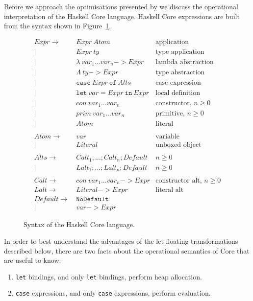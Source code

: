 Before we approach the optimisations presented by \citet{jones1996} we discuss the operational interpretation of the Haskell Core language. Haskell Core expressions are built from the syntax shown in Figure~\ref{fig:haskell_core}.

\begin{figure}[h]
\begin{align*}
Expr \to~& Expr~Atom & \text{application}\\
|~& Expr~ty & \text{type application}\\
|~& \lambda~var_1 ... var_n \mathtt{{-}{>}} Expr & \text{lambda abstraction}\\
|~& \Lambda~ty \mathtt{{-}{>}} Expr & \text{type abstraction}\\
|~& \mathtt{case}~Expr~\mathtt{of}~Alts & \text{case expression}\\
|~& \mathtt{let}~var\mathtt{=}Expr~\mathtt{in}~Expr & \text{local definition}\\
|~& con~var_1 ... var_n & \text{constructor, $n \geq 0$}\\
|~& prim~var_1 ... var_n & \text{primitive, $n \geq 0$}\\
|~& Atom & \text{literal}\\
\\
Atom \to~& var & \text{variable}\\
|~& Literal & \text{unboxed object}\\
\\
Alts \to~& Calt_1; ...; Calt_n; Default & \text{$n \geq 0$}\\
|~& Lalt_1; ...; Lalt_n; Default & \text{$n \geq 0$}\\
\\
Calt \to~& con~var_1 ... var_n \mathtt{{-}{>}} Expr & \text{constructor alt, $n \geq 0$}\\
Lalt \to~& Literal \mathtt{{-}{>}} Expr & \text{literal alt}\\
Default \to~& \mathtt{NoDefault} & \text{}\\
|~& var \mathtt{{-}{>}} Expr & \text{}
\end{align*}
\caption{Syntax of the Haskell Core language.}
\label{fig:haskell_core}
\end{figure}

In order to best understand the advantages of the let-floating transformations described below, there are two facts about the operational semantics of Core that are useful to know:
\begin{enumerate}
\item \lstinline{let} bindings, and only \lstinline{let} bindings, perform heap allocation.
\item \lstinline{case} expressions, and only \lstinline{case} expressions, perform evaluation.
\end{enumerate}

